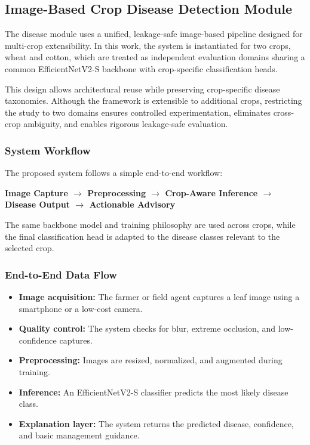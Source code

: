 \documentclass[conference]{IEEEtran}
\begin{document}
\subsection{Image-Based Crop Disease Detection Module}
The disease module uses a unified, leakage-safe image-based pipeline designed for multi-crop extensibility. In this work, the system is instantiated for two crops, wheat and cotton, which are treated as independent evaluation domains sharing a common EfficientNetV2-S backbone with crop-specific classification heads.

This design allows architectural reuse while preserving crop-specific disease taxonomies. Although the framework is extensible to additional crops, restricting the study to two domains ensures controlled experimentation, eliminates cross-crop ambiguity, and enables rigorous leakage-safe evaluation.

\subsubsection{System Workflow}
The proposed system follows a simple end-to-end workflow:
\begin{center}
\textbf{Image Capture $\rightarrow$ Preprocessing $\rightarrow$ Crop-Aware Inference $\rightarrow$ Disease Output $\rightarrow$ Actionable Advisory}
\end{center}
The same backbone model and training philosophy are used across crops, while the final classification head is adapted to the disease classes relevant to the selected crop.

\subsubsection{End-to-End Data Flow}
\begin{itemize}
\item \textbf{Image acquisition:} The farmer or field agent captures a leaf image using a smartphone or a low-cost camera.
\item \textbf{Quality control:} The system checks for blur, extreme occlusion, and low-confidence captures.
\item \textbf{Preprocessing:} Images are resized, normalized, and augmented during training.
\item \textbf{Inference:} An EfficientNetV2-S classifier predicts the most likely disease class.
\item \textbf{Explanation layer:} The system returns the predicted disease, confidence, and basic management guidance.
\end{itemize}
\end{document}
